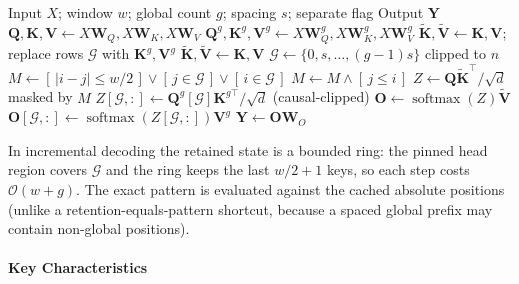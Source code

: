 \begin{algorithm}[H]
\caption{Fast Conformer limited-context attention (masked-dense reference form)}
\begin{algorithmic}[1]
\Require Input $X$; window $w$; global count $g$; spacing $s$; separate flag
\Ensure Output $\mathbf{Y}$
\State $\mathbf{Q},\mathbf{K},\mathbf{V} \gets X\mathbf{W}_Q, X\mathbf{W}_K, X\mathbf{W}_V$
    \State $\mathbf{Q}^{g},\mathbf{K}^{g},\mathbf{V}^{g} \gets X\mathbf{W}_Q^{g}, X\mathbf{W}_K^{g}, X\mathbf{W}_V^{g}$
    \State $\tilde{\mathbf{K}}, \tilde{\mathbf{V}} \gets \mathbf{K}, \mathbf{V}$; replace rows $\mathcal{G}$ with $\mathbf{K}^{g}, \mathbf{V}^{g}$
\Else
    \State $\tilde{\mathbf{K}}, \tilde{\mathbf{V}} \gets \mathbf{K}, \mathbf{V}$
\EndIf
\State $\mathcal{G} \gets \{0, s, \dots, (g-1)s\}$ clipped to $n$
\State $M \gets [\,|i-j| \le w/2\,] \vee [\,j \in \mathcal{G}\,] \vee [\,i \in \mathcal{G}\,]$
 $M \gets M \wedge [\,j \le i\,]$ \EndIf
\State $Z \gets \mathbf{Q}\tilde{\mathbf{K}}^{\top}/\sqrt{d}$ masked by $M$
    \State $Z[\mathcal{G},:] \gets \mathbf{Q}^{g}[\mathcal{G}]\mathbf{K}^{g\top}/\sqrt{d}$ (causal-clipped)
\EndIf
\State $\mathbf{O} \gets \operatorname{softmax}(Z)\tilde{\mathbf{V}}$
    \State $\mathbf{O}[\mathcal{G},:] \gets \operatorname{softmax}(Z[\mathcal{G},:])\mathbf{V}^{g}$ 
\EndIf
\State $\mathbf{Y} \gets \mathbf{O}\mathbf{W}_O$
\end{algorithmic}
\end{algorithm}

In incremental decoding the retained state is a bounded ring: the pinned head region covers $\mathcal{G}$ and the ring keeps the last $w/2+1$ keys, so each step costs $\mathcal{O}(w+g)$. The exact pattern is evaluated against the cached absolute positions (unlike a retention-equals-pattern shortcut, because a spaced global prefix may contain non-global positions).

\paragraph{Key Characteristics}

